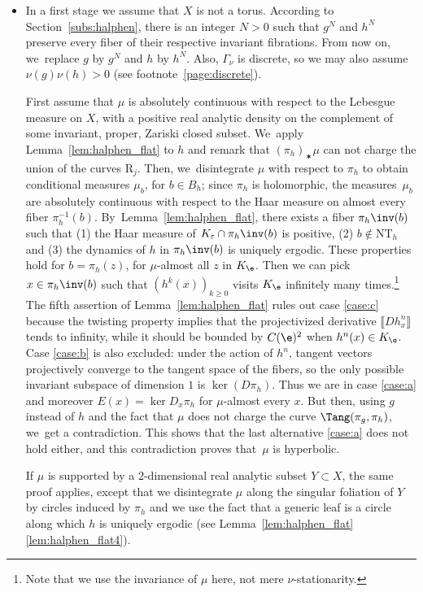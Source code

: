 \begin{itemize}
\item
In a first stage we assume that $X$ is not a torus. According to Section~\ref{subs:halphen}, there is an integer $N>0$ such that $g^N$ and $h^N$
preserve every fiber of their respective invariant fibrations. From now on, we~replace $g$ by $g^N$ and $h$ by $h^N$. Also, $\Gamma_\nu$ is discrete, so we may also assume $\nu(g)\nu(h)>0$ (see footnote~\ref{page:discrete}).

First assume that $\mu$ is absolutely continuous with respect to the Lebesgue measure on $X$, with a positive real analytic density
on the complement of some invariant, proper, Zariski closed subset. We~apply Lemma~\ref{lem:halphen_flat} to $h$ and remark that
$(\pi_h)_\varstar \mu$ can not charge the union of the curves $\mathrm R_j$. Then, we~disintegrate $\mu$ with respect to $\pi_h$ to obtain
conditional measures $\mu_b$, for $b\in B_h$; since $\pi_h$ is holomorphic, the measures~$\mu_b$ are
absolutely continuous with respect to the Haar measure on almost every fiber $\pi_h^{-1}(b)$. By~Lemma~\ref{lem:halphen_flat},
there exists a fiber $\pi_h\inv(b)$ such that (1) the Haar measure of
$K_\varepsilon \cap \pi_h\inv(b)$ is positive,
(2) $b \notin \mathrm{NT}_h$ and (3)
the dynamics of $h$ in $\pi_h\inv(b)$ is uniquely ergodic. These properties hold for $b=\pi_h(z)$, for $\mu$-almost all $z$ in $K_\e$.
Then we can pick $x\in \pi_h\inv(b)$ such that $(h^{k}(x))_{k\geq 0}$ visits $K_\e$ infinitely many times.\footnote{Note that we use the invariance of $\mu$ here, not mere $\nu$-stationarity.} The fifth assertion of Lemma~\ref{lem:halphen_flat}
rules out case \eqref{case:c} because the twisting property implies that the projectivized derivative $\llbracket Dh^n_x \rrbracket$ tends to infinity, while it should be bounded
by $C(\e)^2$ when $h^n(x)\in K_\e$.
Case \eqref{case:b} is also excluded: under the action of $h^n$, tangent vectors projectively
converge to the tangent space of the fibers, so the only possible invariant subspace of dimension $1$ is $\ker(D\pi_h)$.
Thus we are in case \eqref{case:a} and moreover $E(x) = \ker D_x\pi_h$ for $\mu$-almost every $x$. But then,
using $g$ instead of $h$ and the fact that $\mu$ does not charge the curve $\Tang(\pi_g, \pi_h)$, we~get a contradiction.
This shows that the last alternative \eqref{case:a} does not hold either, and this contradiction proves that~$\mu$ is hyperbolic.

If $\mu$ is supported by a $2$-dimensional real analytic subset $Y\subset X$, the same proof applies,
except that we disintegrate
$\mu$ along the singular foliation of $Y$ by circles induced by $\pi_h$ and we use the fact that a generic leaf is a
circle along which
$h$ is uniquely ergodic (see Lemma~\ref{lem:halphen_flat}\eqref{lem:halphen_flat4}).


\end{itemize}
